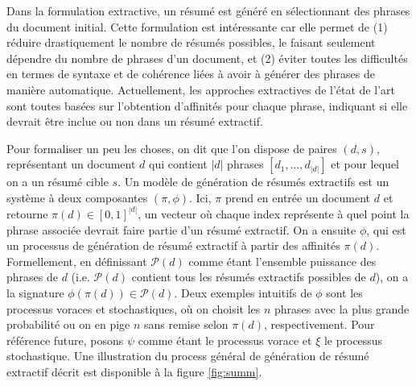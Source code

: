 Dans la formulation extractive, un résumé est généré en sélectionnant 
des phrases du document initial.
Cette formulation est intéressante car elle permet 
de (1) réduire drastiquement le nombre de résumés possibles, le faisant 
seulement dépendre du nombre de phrases d'un document, et (2) éviter 
toutes les difficultés en termes de syntaxe
et de cohérence liées à avoir à générer des phrases de manière automatique.
Actuellement, les approches extractives de l'état de l'art sont
toutes basées sur l'obtention d'affinités pour chaque phrase, indiquant
si elle devrait être inclue ou non dans un résumé extractif.

Pour formaliser un peu les choses, on dit que l'on dispose de paires $(d,s)$,
représentant un document $d$ qui contient $|d|$ phrases $[d_1, ..., d_{|d|}]$
et pour lequel on a un résumé cible $s$.
Un modèle de génération de résumés extractifs est un système à deux composantes 
$(\pi, \phi)$.
Ici, $\pi$ prend en entrée un document $d$ et retourne
$\pi(d) \in [0, 1]^{|d|}$, un vecteur où chaque index représente à quel 
point la phrase associée devrait faire partie d'un résumé extractif.
On a ensuite $\phi$, qui est un processus de génération de résumé
extractif à partir des affinités $\pi(d)$.
Formellement, en définissant $\mathscr{P}(d)$ comme étant l'ensemble puissance 
des phrases de $d$ (i.e. $\mathscr{P}(d)$ contient tous les résumés extractifs possibles
de $d$), on a la signature $\phi(\pi(d)) \in \mathscr{P}(d)$.
Deux exemples intuitifs de $\phi$ sont les processus voraces et stochastiques,
où on choisit les $n$ phrases avec la plus grande probabilité ou on en pige
$n$ sans remise selon $\pi(d)$, respectivement.
Pour référence future, posons $\psi$ comme étant le processus vorace et
$\xi$ le processus stochastique.
Une illustration du process général de génération de résumé extractif décrit
est disponible à la figure \ref{fig:summ}.



